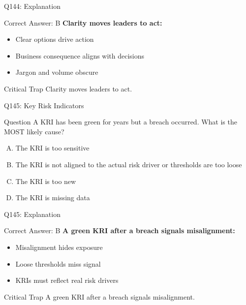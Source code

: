 \documentclass{beamer}
\begin{document}
	\begin{frame}{Q144: Explanation}
		\begin{block}{Correct Answer: B}
			\textbf{Clarity moves leaders to act:}
			\begin{itemize}
				\item Clear options drive action
				\item Business consequence aligns with decisions
				\item Jargon and volume obscure
			\end{itemize}
		\end{block}
		\begin{alertblock}{Critical Trap}
			Clarity moves leaders to act.
		\end{alertblock}
	\end{frame}
	
	\begin{frame}{Q145: Key Risk Indicators}
		\begin{block}{Question}
			A KRI has been green for years but a breach occurred. What is the MOST likely cause?
		\end{block}
		\begin{enumerate}[(A)]
			\item The KRI is too sensitive
			\item The KRI is not aligned to the actual risk driver or thresholds are too loose
			\item The KRI is too new
			\item The KRI is missing data
		\end{enumerate}
	\end{frame}
	
	\begin{frame}{Q145: Explanation}
		\begin{block}{Correct Answer: B}
			\textbf{A green KRI after a breach signals misalignment:}
			\begin{itemize}
				\item Misalignment hides exposure
				\item Loose thresholds miss signal
				\item KRIs must reflect real risk drivers
			\end{itemize}
		\end{block}
		\begin{alertblock}{Critical Trap}
			A green KRI after a breach signals misalignment.
		\end{alertblock}
	\end{frame}
	
\end{document}

